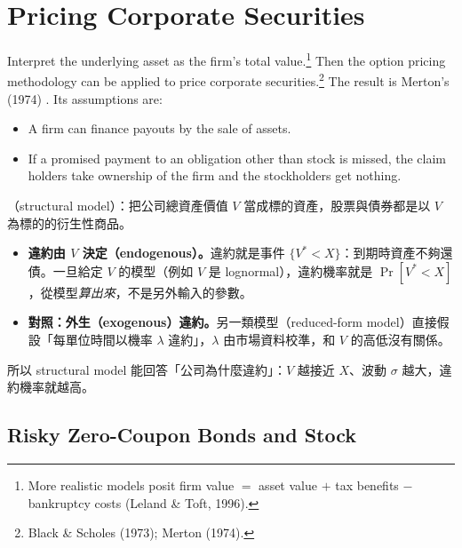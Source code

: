 \section{Pricing Corporate Securities}
\label{sec:merton-model}


Interpret the underlying asset as the firm's total value.\footnote{More realistic models posit firm value $=$ asset value $+$ tax benefits $-$ bankruptcy costs (Leland \& Toft, 1996).}
Then the option pricing methodology can be applied to price corporate securities.\footnote{Black \& Scholes (1973); Merton (1974).}
The result is Merton's (1974) .
Its assumptions are:
\begin{itemize}[nosep]
	\item A firm can finance payouts by the sale of assets.
	\item If a promised payment to an obligation other than stock is missed, the claim holders take ownership of the firm and the stockholders get nothing.
\end{itemize}

\suppstart
{}

\begin{remark}
	（structural model）：把公司總資產價值 $V$ 當成標的資產，股票與債券都是以 $V$ 為標的的衍生性商品。
	\begin{itemize}[nosep]
		\item \textbf{違約由 $V$ 決定（endogenous）。}違約就是事件 $\{V^{*}<X\}$：到期時資產不夠還債。一旦給定 $V$ 的模型（例如 $V$ 是 lognormal），違約機率就是 $\Pr[V^{*}<X]$，從模型\emph{算出來}，不是另外輸入的參數。
		\item \textbf{對照：外生（exogenous）違約。}另一類模型（reduced-form model）直接假設「每單位時間以機率 $\lambda$ 違約」，$\lambda$ 由市場資料校準，和 $V$ 的高低沒有關係。
	\end{itemize}
	所以 structural model 能回答「公司為什麼違約」：$V$ 越接近 $X$、波動 $\sigma$ 越大，違約機率就越高。
\end{remark}
\suppend

\subsection{Risky Zero-Coupon Bonds and Stock}

